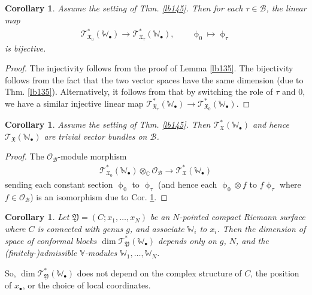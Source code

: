 \documentclass[11pt,b5paper,notitlepage]{article}
\theoremstyle{definition}
\theoremstyle{plain}
\newtheorem{co}[df]{Corollary}
\newcommand{\fk}{\mathfrak}
\newcommand{\mc}{\mathcal}
\newcommand{\scr}{\mathscr}
\newcommand{\blt}{\bullet}
\newcommand{\Vbb}{\mathbb V}
\newcommand{\Wbb}{\mathbb W}
\newcommand{\Cbb}{\mathbb C}
\numberwithin{equation}{section}
\begin{document}
\subsection{}

\begin{co}\label{lb146}
Assume the setting of Thm. \ref{lb145}. Then for each $\tau\in\mc B$, the linear map
\begin{align*}
\scr T_{\fk X_0}^*(\Wbb_\blt)\rightarrow\scr T_{\fk X_\tau}^*(\Wbb_\blt),\qquad \upphi_0\mapsto\upphi_\tau
\end{align*}
is bijective.
\end{co}


\begin{proof}
The injectivity follows from the proof of Lemma \ref{lb135}. The bijectivity follows from the fact that the two vector spaces have the same dimension (due to Thm. \ref{lb135}). Alternatively, it follows from that by switching the role of $\tau$ and $0$, we have a similar injective linear map $\scr T^*_{\fk X_\tau}(\Wbb_\blt)\rightarrow\scr T^*_{\fk X_0}(\Wbb_\blt)$.
\end{proof}


\begin{co}
Assume the setting of Thm. \ref{lb145}. Then $\scr T_{\fk X}^*(\Wbb_\blt)$ and hence $\scr T_{\fk X}(\Wbb_\blt)$ are  trivial vector bundles on $\mc B$.
\end{co}

\begin{proof}
The $\scr O_{\mc B}$-module morphism
\begin{align*}
\scr T_{\fk X_0}^*(\Wbb_\blt)\otimes_\Cbb\scr O_{\mc B}\rightarrow\scr T_{\fk X}^*(\Wbb_\blt)
\end{align*}
sending each constant section $\upphi_0$ to $\upphi_\tau$ (and hence each $\upphi_0\otimes f$ to $f\upphi_\tau$ where $f\in\scr O_{\mc B}$) is an isomorphism due to Cor. \ref{lb146}.
\end{proof}



\begin{co}
Let $\fk Y=(C;x_1,\dots,x_N)$ be an $N$-pointed compact Riemann surface where $C$ is connected with genus $g$, and associate $\Wbb_i$ to $x_i$. Then the dimension of space of conformal blocks $\dim\scr T_{\fk Y}^*(\Wbb_\blt)$ depends only on $g$, $N$, and the (finitely-)admissible $\Vbb$-modules $\Wbb_1,\dots,\Wbb_N$.
\end{co}

So, $\dim\scr T_{\fk Y}^*(\Wbb_\blt)$ does not depend on the complex structure of $C$, the position of $x_\blt$, or the choice of local coordinates. 
\end{document}
